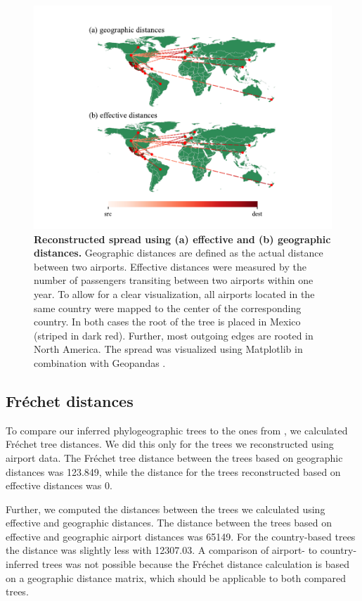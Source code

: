 \documentclass{article}
\begin{document}
\begin{figure}[!ht]
    \centering
    \includegraphics[width=\linewidth,trim={1.5cm 0 1.5cm 0}]{country_effective_country.pdf}
    \caption{\textbf{Reconstructed spread using (a) effective and (b) geographic
    distances.} Geographic distances are defined as the actual distance between
    two airports. Effective distances were measured by the number of passengers
    transiting between two airports within one year. To allow for a clear
    visualization, all airports located in the same country were mapped to the
    center of the corresponding country. In both cases the root of the tree is
    placed in Mexico (striped in dark red). Further, most outgoing edges are
    rooted in North America. The spread was visualized using Matplotlib
    \cite{MatplotlibVisualizationPython} in combination with Geopandas
    \cite{GeoPandas12GeoPandas}.}%
    \label{fig:world_comp}
\end{figure}

\subsection{Fr\'{e}chet distances} To compare our inferred phylogeographic trees
to the ones from \cite{reimeringPhylogeographicReconstructionUsing2020}, we
calculated Fr\'{e}chet tree distances. We did this only for the trees we
reconstructed using airport data. The Fr\'{e}chet tree distance between the
trees based on geographic distances was 123.849, while the distance for the
trees reconstructed based on effective distances was 0.

Further, we computed the distances between the trees we calculated using
effective and geographic distances. The distance between the trees based on
effective and geographic airport distances was 65149. For the country-based
trees the distance was slightly less with 12307.03. A comparison of airport- to
country-inferred trees was not possible because the Fr\'{e}chet distance
calculation is based on a geographic distance matrix, which should be applicable
to both compared trees.
\end{document}
